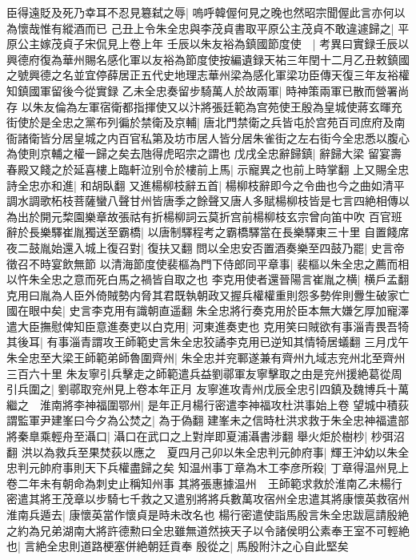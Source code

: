 臣得遠貶及死乃幸耳不忍見簒弑之辱|{
	嗚呼韓偓何見之晚也然昭宗聞偓此言亦何以為懷哉惟有縱酒而已}
己丑上令朱全忠與李茂貞書取平原公主茂貞不敢違遽歸之|{
	平原公主嫁茂貞子宋侃見上卷上年}
壬辰以朱友裕為鎮國節度使　|{
	考異曰實録壬辰以興德府復為華州賜名感化軍以友裕為節度使按編遺録天祐三年閏十二月乙丑敕鎮國之號興德之名並宜停薛居正五代史地理志華州梁為感化軍梁功臣傳天復三年友裕權知鎮國軍留後今從實録}
乙未全忠奏留步騎萬人於故兩軍|{
	時神策兩軍已散而營署尚存}
以朱友倫為左軍宿衛都指揮使又以汴將張廷範為宫苑使王殷為皇城使蔣玄暉充街使於是全忠之黨布列徧於禁衛及京輔|{
	唐北門禁衛之兵皆屯於宫苑百司庶府及南衙諸衛皆分居皇城之内百官私第及坊市居人皆分居朱雀街之左右街今全忠悉以腹心為使則京輔之權一歸之矣去虺得虎昭宗之謂也}
戊戌全忠辭歸鎮|{
	辭歸大梁}
留宴壽春殿又餞之於延喜樓上臨軒泣别令於樓前上馬|{
	示寵異之也前上時掌翻}
上又賜全忠詩全忠亦和進|{
	和胡臥翻}
又進楊柳枝辭五首|{
	楊柳枝辭即今之令曲也今之曲如清平調水調歌柘枝菩薩蠻八聲甘州皆唐季之餘聲又唐人多賦楊柳枝皆是七言四絶相傳以為出於開元棃園樂章故張祜有折楊柳詞云莫折宫前楊柳枝玄宗曾向笛中吹}
百官班辭於長樂驛崔胤獨送至霸橋|{
	以唐制驛程考之霸橋驛當在長樂驛東三十里}
自置餞席夜二鼓胤始還入城上復召對|{
	復扶又翻}
問以全忠安否置酒奏樂至四鼓乃罷|{
	史言帝徵召不時宴飲無節}
以清海節度使裴樞為門下侍郎同平章事|{
	裴樞以朱全忠之薦而相以忤朱全忠之意而死白馬之禍皆自取之也}
李克用使者還晉陽言崔胤之横|{
	横戶孟翻}
克用曰胤為人臣外倚賊勢内脅其君既執朝政又握兵權權重則怨多勢侔則釁生破家亡國在眼中矣|{
	史言李克用有識朝直遥翻}
朱全忠將行奏克用於臣本無大嫌乞厚加寵澤遣大臣撫慰俾知臣意進奏吏以白克用|{
	河東進奏吏也}
克用笑曰賊欲有事淄青畏吾犄其後耳|{
	有事淄青謂攻王師範史言朱全忠狡譎李克用已逆知其情犄居蟻翻}
三月戊午朱全忠至大梁王師範弟師魯圍齊州|{
	朱全忠并兖鄆遂兼有齊州九域志兖州北至齊州三百六十里}
朱友寧引兵擊走之師範遣兵益劉鄩軍友寧擊取之由是兖州援絶葛從周引兵圍之|{
	劉鄩取兖州見上卷本年正月}
友寧進攻青州戊辰全忠引四鎮及魏博兵十萬繼之　淮南將李神福圍鄂州|{
	是年正月楊行密遣李神福攻杜洪事始上卷}
望城中積荻謂監軍尹建峯曰今夕為公焚之|{
	為于偽翻}
建峯未之信時杜洪求救于朱全忠神福遣部將秦臯乘輕舟至灄口|{
	灄口在武口之上對岸即夏浦灄書涉翻}
舉火炬於樹杪|{
	杪弭沼翻}
洪以為救兵至果焚荻以應之　夏四月己卯以朱全忠判元帥府事|{
	輝王沖幼以朱全忠判元帥府事則天下兵權盡歸之矣}
知温州事丁章為木工李彦所殺|{
	丁章得温州見上卷二年未有朝命為刺史止稱知州事}
其將張惠據温州　王師範求救於淮南乙未楊行密遣其將王茂章以步騎七千救之又遣别將將兵數萬攻宿州全忠遣其將康懷英救宿州淮南兵遁去|{
	康懷英當作懷貞是時未改名也}
楊行密遣使詣馬殷言朱全忠跋扈請殷絶之約為兄弟湖南大將許德勲曰全忠雖無道然挾天子以令諸侯明公素奉王室不可輕絶也|{
	言絶全忠則道路梗塞併絶朝廷貢奉}
殷從之|{
	馬殷附汴之心自此堅矣}
